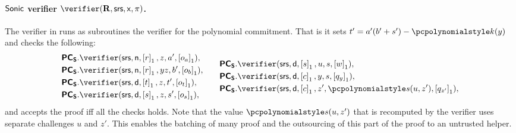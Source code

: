 \documentclass[runningheads,11pt]{llncs}
\begin{document}
\paragraph{${\textnormal{\textsf{Sonic}}}$ verifier $\verifier(\REL, \srs, \inp, \zkproof)$.} The verifier
in \sonic{} runs as subroutines the verifier for the polynomial commitment. That
is it sets $t' = a'(b' + s') - \p{k}(y)$ and checks the following:
\begin{equation*}
  \begin{split}
    &\PCOMs.\verifier(\srs, \multconstr, \gone{r}, z, a', \gone{o_a}), \\
    &\PCOMs.\verifier(\srs, \multconstr, \gone{r}, yz, b', \gone{o_b}),\\
    &\PCOMs.\verifier(\srs, \dconst, \gone{t}, z, t', \gone{o_t}),\\
    &\PCOMs.\verifier(\srs, \dconst, \gone{s}, z, s', \gone{o_s}),\\
  \end{split}
  \qquad
  \begin{split}
    &\PCOMs.\verifier(\srs, \dconst, \gone{s}, u, s, \gone{w}),\\
    &\PCOMs.\verifier(\srs, \dconst, \gone{c}, y, s, \gone{q_y}),\\
    &\PCOMs.\verifier(\srs, \dconst, \gone{c}, z', \p{s}(u, z'), \gone{q_{z'}}),
  \end{split}
\end{equation*}
and accepts the proof iff all the checks holds. Note that the value $\p{s}(u, z')$ that is recomputed by the verifier uses separate challenges $u$ and $z'$. This enables the batching of many proof and the outsourcing of this part of the proof to an untrusted helper. 
\end{document}
